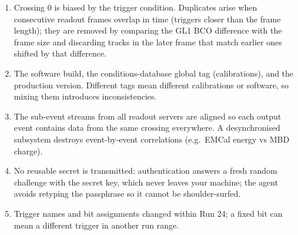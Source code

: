 \documentclass[11pt,letterpaper]{article}
\begin{document}
\begin{enumerate}
\item Crossing 0 is biased by the trigger condition. Duplicates arise when consecutive readout frames overlap in time (triggers closer than the frame length); they are removed by comparing the GL1 BCO difference with the frame size and discarding tracks in the later frame that match earlier ones shifted by that difference.
\item The software build, the conditions-database global tag (calibrations), and the production version. Different tags mean different calibrations or software, so mixing them introduces inconsistencies.
\item The sub-event streams from all readout servers are aligned so each output event contains data from the same crossing everywhere. A desynchronised subsystem destroys event-by-event correlations (e.g.\ EMCal energy vs MBD charge).
\item No reusable secret is transmitted: authentication answers a fresh random challenge with the secret key, which never leaves your machine; the agent avoids retyping the passphrase so it cannot be shoulder-surfed.
\item Trigger names and bit assignments changed within Run 24; a fixed bit can mean a different trigger in another run range.
\end{enumerate}

\end{document}
